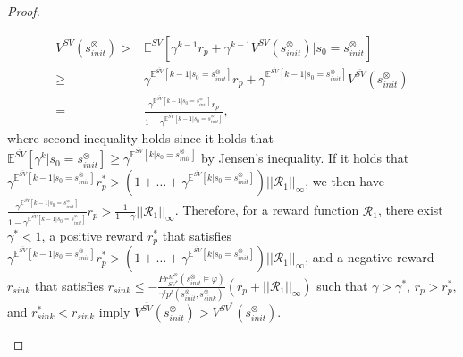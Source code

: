 \documentclass[10pt]{article}
\theoremstyle{definition}
\begin{document}
\begin{proof}
\begin{enumerate}
    \begin{align}
      V^{\bar{SV}}(s^{\otimes}_{init})
       > & \mathbb{E}^{\bar{SV}} [ \gamma^{k-1} r_p + \gamma^{k-1} V^{\bar{SV}}(s^{\otimes}_{init}) | s_0 = s^{\otimes}_{init} ] \nonumber \\
       \geq & \gamma^{\mathbb{E}^{\bar{SV}}[k - 1 | s_0 = s^{\otimes}_{init} ]} r_p + \gamma^{\mathbb{E}^{\bar{SV}}[ k - 1 | s_0 = s^{\otimes}_{init} ]} V^{\bar{SV}}(s^{\otimes}_{init}) \nonumber \\
       = & \frac{ \gamma^{\mathbb{E}^{\bar{SV}}[k - 1 | s_0 = s^{\otimes}_{init} ]} r_p } { 1 - \gamma^{\mathbb{E}^{\bar{SV}}[k - 1 | s_0 = s^{\otimes}_{init} ]}}, \nonumber
    \end{align}
 where second inequality holds since it holds that $\mathbb{E}^{\bar{SV}} [ \gamma^k | s_0 = s^{\otimes}_{init} ] \geq \gamma^{\mathbb{E}^{\bar{SV}}[k | s_0 = s^{\otimes}_{init} ]}$ by Jensen's inequality. If it holds that $\gamma^{\mathbb{E}^{\bar{SV}}[k - 1 | s_0 = s^{\otimes}_{init} ]} r^{\ast}_p > (1 + \ldots + \gamma^{\mathbb{E}^{\bar{SV}}[k | s_0 = s^{\otimes}_{init} ]} ) ||\mathcal{R}_1||_{\infty}$, we then have $ \frac{ \gamma^{\mathbb{E}^{\bar{SV}}[k - 1 | s_0 = s^{\otimes}_{init} ]} } { 1 - \gamma^{\mathbb{E}^{\bar{SV}}[k - 1 | s_0 = s^{\otimes}_{init} ]}} r_p > \frac{1}{1-\gamma} ||\mathcal{R}_1||_{\infty}$.
  Therefore, for a reward function $\mathcal{R}_1$, there exist $\gamma^{\ast} < 1$, a positive reward $r^{\ast}_p$ that satisfies $\gamma^{\mathbb{E}^{\bar{SV}}[k - 1 | s_0 = s^{\otimes}_{init} ]} r^{\ast}_p > (1 + \ldots + \gamma^{\mathbb{E}^{\bar{SV}}[k | s_0 = s^{\otimes}_{init} ]} ) ||\mathcal{R}_1||_{\infty}$, and a negative reward $r_{sink}$ that satisfies $r_{sink} \leq - \frac{Pr^{M^{\otimes}}_{SV^{\ast}}(s^{\otimes}_{init} \models \varphi)}{ \gamma^l p^l (s^{\otimes}_{init}, s^{\otimes}_{sink})} (r_p + ||\mathcal{R}_1||_{\infty})$ such that $\gamma > \gamma^{\ast} $, $r_p > r^{\ast}_p$, and $r^{\ast}_{sink} < r_{sink}$ imply $V^{\bar{SV}}(s^{\otimes}_{init}) > V^{SV^{\ast}}(s^{\otimes}_{init})$.


\end{enumerate}
\end{proof}
\end{document}
